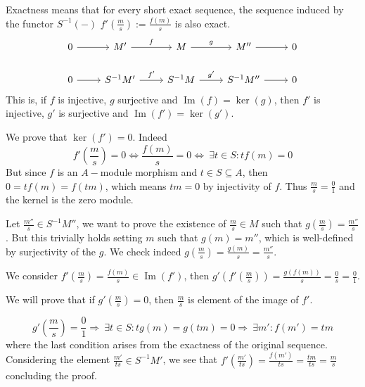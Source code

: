 \documentclass[leqno]{article}
\DeclareMathOperator{\im}{Im}
\begin{document}
Exactness means that for every short exact sequence, the sequence induced by the functor $S^{-1}(-)$ $f'(\frac{m}{s}):= \frac{f(m)}{s}$ is also exact.
\[\begin{tikzcd}
	0 & {M'} & M & {M''} & 0 \\
	0 & {S^{-1}M'} & {S^{-1}M} & {S^{-1}M''} & 0
	\arrow[from=1-1, to=1-2]
	\arrow["f", from=1-2, to=1-3]
	\arrow["g", from=1-3, to=1-4]
	\arrow[from=1-4, to=1-5]
	\arrow[from=2-1, to=2-2]
	\arrow["{f'}", from=2-2, to=2-3]
	\arrow["{g'}", from=2-3, to=2-4]
	\arrow[from=2-4, to=2-5]
\end{tikzcd}\]
This is, if $f$ is injective,  $g$ surjective and  $\im(f)=\ker (g)$, then $f'$ is injective,  $g'$ is surjective and  $\im(f')=\ker(g')$.

 We prove that $\ker(f')=0$. Indeed  
\[
f'(\frac{m}{s})=0 \iff \frac{f(m)}{s} = 0 \iff \ \exists t\in S: tf(m) = 0
\] 
But since $f$ is an  $A-$module morphism and $t\in S\subseteq A$, then $0=tf(m)=f(tm)$, which means  $tm=0$ by injectivity of $f$. Thus  $\frac{m}{s}=\frac{0}{1}$ and the kernel is the zero module.

 Let $\frac{m''}{s}\in S^{-1}M''$, we want to prove the existence of $\frac{m}{s}\in M$ such that $g(\frac{m}{s}) = \frac{m''}{s}$. But this trivially holds setting $m$ such that  $g(m)=m''$, which is well-defined by surjectivity of the $g$. We check indeed  $g(\frac{m}{s}) = \frac{g(m)}{s} = \frac{m''}{s}$.


\fbox{$\im(f')\subseteq \ker(g')$} We consider $f'(\frac{m}{s})= \frac{f(m)}{s} \in \im(f')$, then $g'(f'(\frac{m}{s}))= \frac{g(f(m))}{s}=\frac{0}{s}=\frac{0}{1}$.


\fbox{$\ker(g')\subseteq \im(f')$} We will prove that if $g'(\frac{m}{s})=0$, then $ \frac{m}{s}$ is element of the image of $f'$.

\[
g'(\frac{m}{s})=\frac{0}{1} \Rightarrow \ \exists t\in S : tg(m)=g(tm) = 0 \Rightarrow \ \exists m': f(m') =tm 
\]
where the last condition arises from the exactness of the original sequence. Considering the element  $\frac{m'}{ts}\in S^{-1}M'$, we see that $f'(\frac{m'}{ts}) = \frac{f(m')}{ts}=\frac{tm}{ts} = \frac{m}{s}$ concluding the proof.
\end{document}
